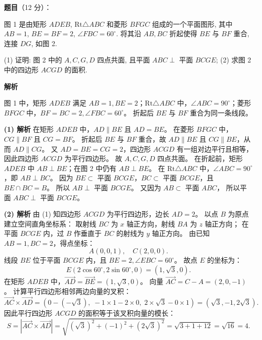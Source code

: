 \begin{answer}

\textbf{题目}（12 分）：

图 1 是由矩形 $ADEB$, $\text{Rt}\triangle ABC$ 和菱形 $BFGC$ 组成的一个平面图形, 其中 $AB = 1$, $BE = BF = 2$, $\angle FBC = 60^\circ$. 将其沿 $AB, BC$ 折起使得 $BE$ 与 $BF$ 重合, 连接 $DG$, 如图 2.
\nopagebreak[4]
\begin{center}\end{center}
\nopagebreak[4]
(1) 证明: 图 2 中的 $A, C, G, D$ 四点共面, 且平面 $ABC \perp$ 平面 $BCGE$;  
(2) 求图 2 中的四边形 $ACGD$ 的面积.

\textbf{解析}

图 1 中，矩形 $ADEB$ 满足 $AB = 1, BE = 2$；$\text{Rt}\triangle ABC$ 中，$\angle ABC = 90^\circ$；菱形 $BFGC$ 中，$BF = BC = 2, \angle FBC = 60^\circ$。
折起后 $BE$ 与 $BF$ 重合为同一条线段。

\textbf{(1) 解析}
在矩形 $ADEB$ 中，$AD \parallel BE$ 且 $AD = BE$。
在菱形 $BFGC$ 中，$CG \parallel BF$ 且 $CG = BF$。
折起后 $BE$ 与 $BF$ 重合，故 $AD \parallel BE$ 且 $CG \parallel BE$，从而 $AD \parallel CG$。
又 $AD = BE = CG = 2$，四边形 $ACGD$ 有一组对边平行且相等，因此四边形 $ACGD$ 为平行四边形。
故 $A, C, G, D$ 四点共面。
在折起前，矩形 $ADEB$ 中 $AB \perp BE$；在图 2 中仍有 $AB \perp BE$。
在 $\text{Rt}\triangle ABC$ 中，$\angle ABC = 90^\circ$，即 $AB \perp BC$。
因为 $BE \subset$ 平面 $BCGE$，$BC \subset$ 平面 $BCGE$，且 $BE \cap BC = B$。
所以 $AB \perp$ 平面 $BCGE$。
又因为 $AB \subset$ 平面 $ABC$，
所以平面 $ABC \perp$ 平面 $BCGE$。

\textbf{(2) 解析}
由 (1) 知四边形 $ACGD$ 为平行四边形，边长 $AD = 2$。
以点 $B$ 为原点建立空间直角坐标系：
取射线 $BC$ 为 $x$ 轴正方向，射线 $BA$ 为 $z$ 轴正方向；
在平面 $BCGE$ 内，过 $B$ 作垂直于 $BC$ 的射线为 $y$ 轴正方向。
由已知 $AB = 1, BC = 2$，得点坐标：
\nopagebreak[4]
\[A(0, 0, 1), \quad C(2, 0, 0).\]
线段 $BE$ 位于平面 $BCGE$ 内，且 $BE = 2, \angle EBC = 60^\circ$。
故点 $E$ 的坐标为：
\nopagebreak[4]
\[E(2\cos 60^\circ, 2\sin 60^\circ, 0) = (1, \sqrt{3}, 0).\]
在矩形 $ADEB$ 中，$\vec{AD} = \vec{BE} = (1, \sqrt{3}, 0)$。
向量 $\vec{AC} = C - A = (2, 0, -1)$。
计算平行四边形相邻两边向量的叉积：
\nopagebreak[4]
\[\vec{AC} \times \vec{AD} = \left(0 - (-\sqrt{3}), \;-1 \times 1 - 2 \times 0, \;2 \times \sqrt{3} - 0 \times 1\right) = (\sqrt{3}, -1, 2\sqrt{3}).\]
因此平行四边形 $ACGD$ 的面积等于该叉积向量的模长：
\nopagebreak[4]
\[S = |\vec{AC} \times \vec{AD}| = \sqrt{(\sqrt{3})^2 + (-1)^2 + (2\sqrt{3})^2} = \sqrt{3 + 1 + 12} = \sqrt{16} = 4.\]



\end{answer}
